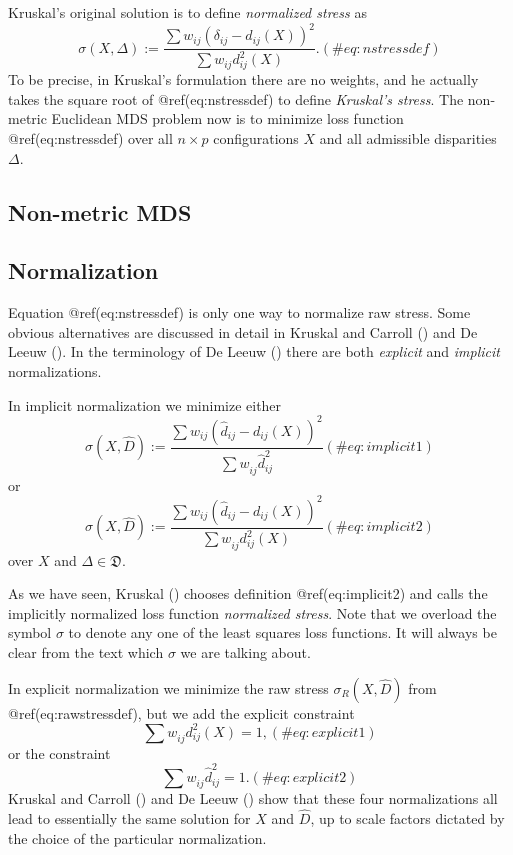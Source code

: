 \documentclass[
  12pt,
  letterpaper,
  DIV=11,
  numbers=noendperiod]{scrartcl}
\theoremstyle{plain}
\theoremstyle{remark}
\begin{document}
Kruskal's original solution is to define \emph{normalized stress} as
\begin{equation}
\sigma(X,\Delta):=\frac{\sum w_{ij}(\delta_{ij}-d_{ij}(X))^2}{\sum w_{ij}d_{ij}^2(X)}.
(\#eq:nstressdef)
\end{equation} To be precise, in Kruskal's formulation there are no
weights, and he actually takes the square root of @ref(eq:nstressdef) to
define \emph{Kruskal's stress}. The non-metric Euclidean MDS problem now
is to minimize loss function @ref(eq:nstressdef) over all \(n\times p\)
configurations \(X\) and all admissible disparities \(\Delta\).

\subsection{Non-metric MDS}\label{non-metric-mds}

\subsection{Normalization}\label{normalization}

Equation @ref(eq:nstressdef) is only one way to normalize raw stress.
Some obvious alternatives are discussed in detail in Kruskal and Carroll
() and De Leeuw
(). In the terminology of De Leeuw
() there are both \emph{explicit} and
\emph{implicit} normalizations.

In implicit normalization we minimize either \begin{equation}
\sigma(X,\hat D):=\frac{\sum  w_{ij}(\hat d_{ij} -d_{ij}(X))^2}{\sum   w_{ij}^{\ }\hat d_{ij}^2}
(\#eq:implicit1)
\end{equation} or \begin{equation}
\sigma(X,\hat D):=\frac{\sum   w_{ij}(\hat d_{ij}-d_{ij}(X))^2}{\sum   w_{ij}^{\ }d_{ij}^2(X) }
(\#eq:implicit2)
\end{equation} over \(X\) and \(\Delta\in\mathfrak{D}\).

As we have seen, Kruskal () chooses
definition @ref(eq:implicit2) and calls the implicitly normalized loss
function \emph{normalized stress}. Note that we overload the symbol
\(\sigma\) to denote any one of the least squares loss functions. It
will always be clear from the text which \(\sigma\) we are talking
about.

In explicit normalization we minimize the raw stress
\(\sigma_R(X,\hat D)\) from @ref(eq:rawstressdef), but we add the
explicit constraint \begin{equation}
\sum   w_{ij}^{\ }d_{ij}^2(X)=1,
(\#eq:explicit1)
\end{equation} or the constraint \begin{equation}
\sum   w_{ij}^{\ }\hat d_{ij}^2=1.
(\#eq:explicit2)
\end{equation} Kruskal and Carroll
() and De Leeuw
() show that these four normalizations
all lead to essentially the same solution for \(X\) and \(\hat D\), up
to scale factors dictated by the choice of the particular normalization.
\end{document}
